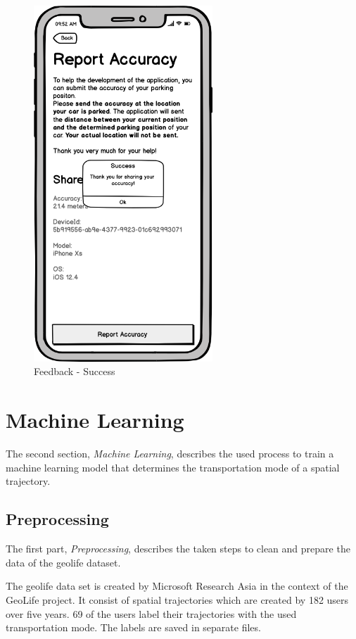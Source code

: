 \begin{figure}[h]
\begin{minipage}[b]{0.49\textwidth}
    \includegraphics[width=0.6\textwidth]{images/UI/Iteration4-Feedback-Success.png}
    \caption{Feedback - Success}
    \label{fig:feedback-succ}
  \end{minipage}
\end{figure}


\section{Machine Learning}
The second section, \textit{Machine Learning}, describes the used process to train a machine learning model that determines the transportation mode of a spatial trajectory.

\subsection{Preprocessing}
The first part, \textit{Preprocessing}, describes the taken steps to clean and prepare the data of the geolife dataset.

The geolife data set is created by Microsoft Research Asia in the context of the GeoLife project. It consist of spatial trajectories which are created by 182 users over five years. 69 of the users label their trajectories with the used transportation mode. The labels are saved in separate files. \cite{zheng2010geolife} \cite{zheng2008understanding} \cite{geolife-dataset} \cite{zheng2009mining}

